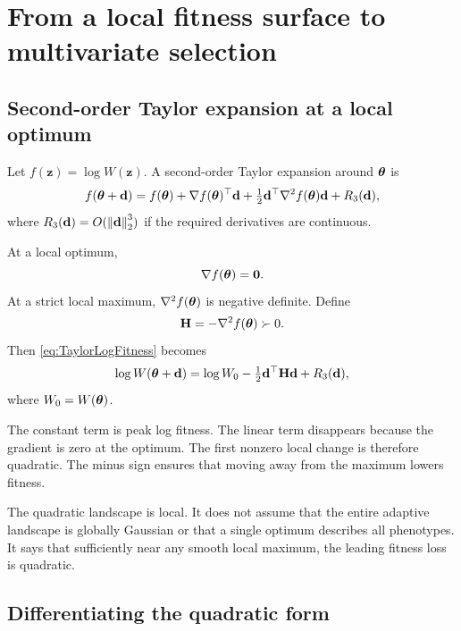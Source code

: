 \chapter{From a local fitness surface to multivariate selection}

\section{Second-order Taylor expansion at a local optimum}

Let \(f(\mathbf z)=\log W(\mathbf z)\). A second-order Taylor expansion around \(\boldsymbol{\theta}\) is
\begin{equation}
f(\boldsymbol{\theta}+\mathbf d)
=f(\boldsymbol{\theta})
+\nabla f(\boldsymbol{\theta})^\top\mathbf d
+\tfrac12\mathbf d^\top\nabla^2f(\boldsymbol{\theta})\mathbf d
+R_3(\mathbf d),
\label{eq:TaylorLogFitness}
\end{equation}
where \(R_3(\mathbf d)=O(\left\lVert \mathbf d\right\rVert_2^3)\) if the required derivatives are continuous.

At a local optimum,
\begin{equation}
\nabla f(\boldsymbol{\theta})=\mathbf{0}.
\end{equation}
At a strict local maximum, \(\nabla^2f(\boldsymbol{\theta})\) is negative definite. Define
\begin{equation}
\mathbf{H}=-\nabla^2f(\boldsymbol{\theta})\succ0.
\end{equation}
Then \cref{eq:TaylorLogFitness} becomes
\begin{equation}
\log W(\boldsymbol{\theta}+\mathbf d)
=\log W_0-\tfrac12\mathbf d^\top\mathbf{H}\mathbf d+R_3(\mathbf d),
\label{eq:quadraticLogFitnessFull}
\end{equation}
where \(W_0=W(\boldsymbol{\theta})\).

\inwords The constant term is peak log fitness. The linear term disappears because the gradient is zero at the optimum. The first nonzero local change is therefore quadratic. The minus sign ensures that moving away from the maximum lowers fitness.

\begin{cautionbox}
The quadratic landscape is local. It does not assume that the entire adaptive landscape is globally Gaussian or that a single optimum describes all phenotypes. It says that sufficiently near any smooth local maximum, the leading fitness loss is quadratic.
\end{cautionbox}

\section{Differentiating the quadratic form}

